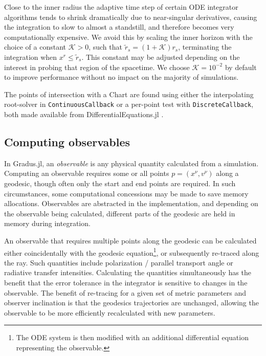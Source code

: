 \documentclass[fleqn,usenatbib]{mnras}
\newcommand{\Gradus}{Gradus.jl\xspace}
\begin{document}
Close to the inner radius the adaptive time step of certain ODE integrator
algorithms tends to shrink dramatically due to near-singular derivatives,
causing the integration to slow to almost a standstill, and therefore becomes
very computationally expensive. We avoid this by scaling the inner horizon
with the choice of a constant $\mathcal{K} > 0$, such that $\tilde{r}_s = (1 +
\mathcal{K}) r_s$, terminating the integration when $x^r \leq
\tilde{r}_s$. This constant may be adjusted depending on the interest
in probing that region of the spacetime. We choose $\mathcal{K} =
10^{-2}$ by default to improve performance without no impact on the majority of
simulations.

The points of intersection with a Chart are found using either the interpolating
root-solver in \texttt{ContinuousCallback} or a per-point test with
\texttt{DiscreteCallback}, both made available from DifferentialEquations.jl
\citep{rackauckas_differential_2017}.

\subsection{Computing observables}
\label{sec:computing-observables}

In \Gradus, an \textit{observable} is any physical quantity calculated from a
simulation. Computing an observable requires some or all points $p = (x^\nu,
v^\nu)$ along a geodesic, though often only the start and end points are
required. In such circumstances, some computational concessions may be made to
save memory allocations. Observables are abstracted in the implementation, and
depending on the observable being calculated, different parts of the geodesic
are held in memory during integration.

An observable that requires multiple points along the geodesic can be calculated
either coincidentally with the geodesic equation\footnote{The ODE system is then
modified with an additional differential equation representing the observable.},
or subsequently re-traced along the ray. Such quantities include polarization /
parallel transport angle or radiative transfer intensities. Calculating the
quantities simultaneously has the benefit that the error tolerance in the
integrator is sensitive to changes in the observable. The benefit of re-tracing
for a given set of metric parameters and observer inclination is that the
geodesics trajectories are unchanged, allowing the observable to be more
efficiently recalculated with new parameters.
\end{document}
